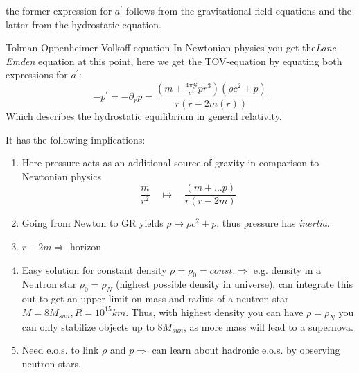 the former expression for $a^{'}$ follows from the gravitational field equations and the latter from the hydrostatic equation.
\begin{mybox}{Tolman-Oppenheimer-Volkoff equation}
	In Newtonian physics you get the\emph{Lane-Emden} equation at this point, here we get the TOV-equation by equating both expressions for $a^{'} $:
	\begin{equation}
	- p^{'}=-\partial_r p = \frac{\left(m+ \frac{4\pi \mathcal{G}}{c^4} p r^3\right) (\rho c^2 +p )}{r(r-2m(r)) }
	\end{equation}
	Which describes the hydrostatic equilibrium in general relativity.
\end{mybox}
It has the following implications:
\begin{enumerate}
	\item Here pressure acts as an additional source of gravity in comparison to Newtonian physics
	\begin{equation}
	\frac{m}{r^2} \quad \mapsto \quad \frac{(m+ \dots p)}{r(r-2m)}
	\end{equation}
	\item Going from Newton to GR yields $\rho \mapsto \rho c^2 +p$, thus pressure has \emph{inertia}.
	\item $r-2m \Rightarrow$ horizon
	\item Easy solution for constant density $\rho=\rho_0=const. \Rightarrow$ e.g. density in a Neutron star $\rho_0 = \rho_N$ (highest possible density in universe), can integrate this out to get an upper limit on mass and radius of a neutron star $M=8 M_{sun}, R=10^{15}km$. Thus, with highest density you can have $\rho = \rho_N$ you can only stabilize objects up to $8 M_{sun}$, as more mass will lead to a supernova.
	\item Need e.o.s. to link $\rho$ and $p \Rightarrow$ can learn about hadronic e.o.s. by observing neutron stars.
	
\end{enumerate}
